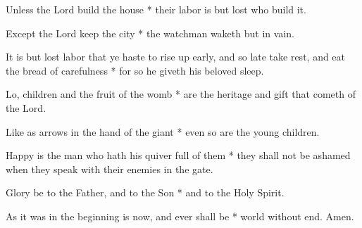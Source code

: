 Unless the Lord build the house * their labor is but lost who build it.

Except the Lord keep the city * the watchman waketh but in vain.

It is but lost labor that ye haste to rise up early, and so late take rest, and eat the bread of carefulness * for so he giveth his beloved sleep.

Lo, children and the fruit of the womb * are the heritage and gift that cometh of the Lord.

Like as arrows in the hand of the giant * even so are the young children.

Happy is the man who hath his quiver full of them * they shall not be ashamed when they speak with their enemies in the gate.

Glory be to the Father, and to the Son * and to the Holy Spirit.

As it was in the beginning is now, and ever shall be * world without end. Amen.